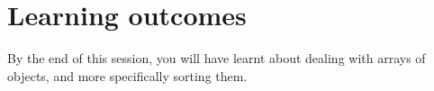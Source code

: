 \renewcommand{\labelenumi}{\alph{enumi}.}
 
\section* {Learning outcomes}

By the end of this session, you will have learnt about dealing with arrays of objects, and more specifically sorting them. 

\begin{center}
\end{center}

